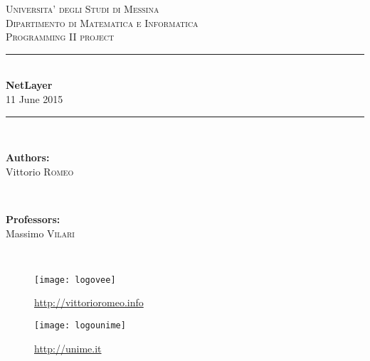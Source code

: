 \documentclass[12pt]{report}
\newcommand{\HRule}{\rule{\linewidth}{0.5mm}}
\renewcommand\emph{\textbf}
\begin{document}
\begin{titlepage}

    \center

    \textsc{\LARGE Universita' degli Studi di Messina}\\[0.1cm]
    \textsc{\Large Dipartimento di Matematica e Informatica}\\[0.5cm]
    \textsc{\Large Programming II project}\\[0.5cm]

    \HRule \\[0.4cm]
    { \huge \bfseries NetLayer}\\[0.1cm]

    {\large 11 June 2015}
    \HRule \\[1.5cm]

    \begin{minipage}{0.4\textwidth}
    \begin{flushleft} \large
    \emph{Authors:}\\
    Vittorio \textsc{Romeo}
    \end{flushleft}
    \end{minipage}
    ~
    \begin{minipage}{0.4\textwidth}
    \begin{flushright} \large
    \emph{Professors:} \\
    Massimo \textsc{Vilari}


    \end{flushright}
    \end{minipage}\\[4cm]

    \vfill


    \begin{minipage}{\linewidth}
        \centering
        \begin{minipage}{0.35\linewidth}
            \begin{figure}[H]
                \center
                \texttt{[image: logovee]}

                \url{http://vittorioromeo.info}
            \end{figure}
        \end{minipage}
        \hspace{0.27\linewidth}
        \begin{minipage}{0.35\linewidth}
            \begin{figure}[H]
                \center
                \texttt{[image: logounime]}

                \url{http://unime.it}
            \end{figure}
        \end{minipage}
    \end{minipage}\\[3cm]
\end{titlepage}



\newcommand{\atoc}[1]{\addtocontents{toc}{#1\par}}
\renewcommand{\thesection}{\arabic{section}.}
\tableofcontents
\newpage
{}
\end{document}
